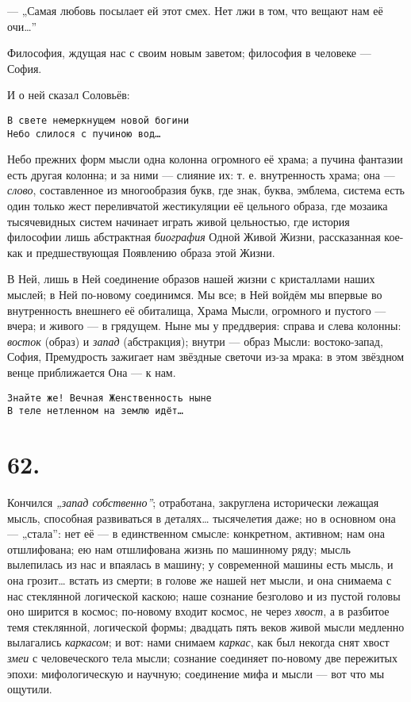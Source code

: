 \documentclass[12pt,a4paper,oneside]{book}
\begin{document}
— „Самая любовь посылает ей этот смех. Нет лжи в том, что вещают нам её очи…”

Философия, ждущая нас с своим новым заветом; философия в человеке — София.

И о ней сказал Соловьёв:

\begin{Verbatim}
В свете немеркнущем новой богини
Небо слилося с пучиною вод…
\end{Verbatim}

Небо прежних форм мысли одна колонна огромного её храма; а пучина фантазии есть другая колонна; и за ними — слияние их: т. е. внутренность храма; она — \emph{слово}, составленное из многообразия букв, где знак, буква, эмблема, система есть один только жест переливчатой жестикуляции её цельного образа, где мозаика тысячевидных систем начинает играть живой цельностью, где история философии лишь абстрактная \emph{биография} Одной Живой Жизни, рассказанная кое-как и предшествующая Появлению образа этой Жизни.

В Ней, лишь в Ней соединение образов нашей жизни с кристаллами наших мыслей; в Ней по-новому соединимся. Мы все; в Ней войдём мы впервые во внутренность внешнего её обиталища, Храма Мысли, огромного и пустого — вчера; и живого — в грядущем. Ныне мы у преддверия: справа и слева колонны: \emph{восток} (образ) и \emph{запад} (абстракция); внутри — образ Мысли: востоко-запад, София, Премудрость зажигает нам звёздные светочи из-за мрака: в этом звёздном венце приближается Она — к нам.

\begin{Verbatim}
Знайте же! Вечная Женственность ныне
В теле нетленном на землю идёт…
\end{Verbatim}

\section*{62.}

Кончился \emph{„запад собственно”}; отработана, закруглена исторически лежащая мысль, способная развиваться в деталях… тысячелетия даже; но в основном она — „стала”: нет её — в единственном смысле: конкретном, активном; нам она отшлифована; ею нам отшлифована жизнь по машинному ряду; мысль вылепилась из нас и впаялась в машину; у современной машины есть мысль, и она грозит… встать из смерти; в голове же нашей нет мысли, и она снимаема с нас стеклянной логической каскою; наше сознание безголово и из пустой головы оно ширится в космос; по-новому входит космос, не через \emph{хвост}, а в разбитое темя стеклянной, логической формы; двадцать пять веков живой мысли медленно вылагались \emph{каркасом}; и вот: нами снимаем \emph{каркас}, как был некогда снят хвост \emph{змеи} с человеческого тела мысли; сознание соединяет по-новому две пережитых эпохи: мифологическую и научную; соединение мифа и мысли — вот что мы ощутили.
\end{document}
